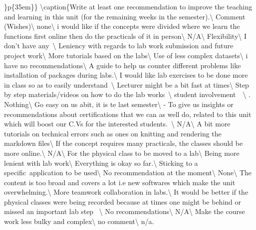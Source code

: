 \documentclass[
]{article}
\begin{document}
\arraybackslash\}p\{35em\}\}
\textbackslash caption\{\label{tab:RawWishesData}Write at least one
recommendation to improve the teaching and learning in this unit (for
the remaining weeks in the semester).\textbackslash{} \toprule Comment
(Wishes)\textbackslash{} \midrule none\textbackslash{} \hline i would
like if the concepts were divided where we learn the functions first
online then do the practicals of it in person\textbackslash{} \hline
N/A\textbackslash{} \hline Flexibility\textbackslash{} \hline I don't
have any~\textbackslash{} \hline Leniency with regards to lab work
submission and future project work\textbackslash{} \hline More tutorials
based on the labs\textbackslash{} \hline Use of less complex
datasets\textbackslash{} \hline i have no
recommendations\textbackslash{} \hline A guide to help us counter
different problems like installation of packages during
labs.\textbackslash{} \hline I would like lab exercises to be done more
in class so as to easily understand~\textbackslash{} \hline Lecturer
might be a bit fast at times\textbackslash{} \hline Step by step
materials/videos on how to do the lab works~\textbackslash{} \hline
student involvement~~\textbackslash{} . Nothing\textbackslash{} \hline Go easy on us abit, it is te last
semester\textbackslash{} \hline - To give us insights or recommendations
about certifications that we can as well do, related to this unit which
will boost our C.Vs for the interested students.~\textbackslash{} \hline
N/A\textbackslash{} \hline A bit more tutorials on technical errors such
as ones on knitting and rendering the markdown files\textbackslash{}
\hline If the concept requires many practicals, the classes should be
more online.\textbackslash{} \hline N/A\textbackslash{} \hline For the
physical class to be moved to a lab\textbackslash{} \hline Being more
lenient with lab work\textbackslash{} \hline Everything is okay so
far.\textbackslash{} \hline Sticking to a specific~application to be
used\textbackslash{} \hline No recommendation at the
moment\textbackslash{} \hline None\textbackslash{} \hline The content is
too broad and covers a lot i.e new softwares which make the unit
overwhelming.\textbackslash{} \hline More teamwork collaboration in
labs.\textbackslash{} \hline It would be better if the physical classes
were being recorded because at times one might be behind or missed an
important lab step ~\textbackslash{} \hline No
recommendations\textbackslash{} \hline N/A\textbackslash{} \hline Make
the course work less bulky and complex\textbackslash{} \hline no
comment\textbackslash{} \hline n/a.\\
\end{document}

